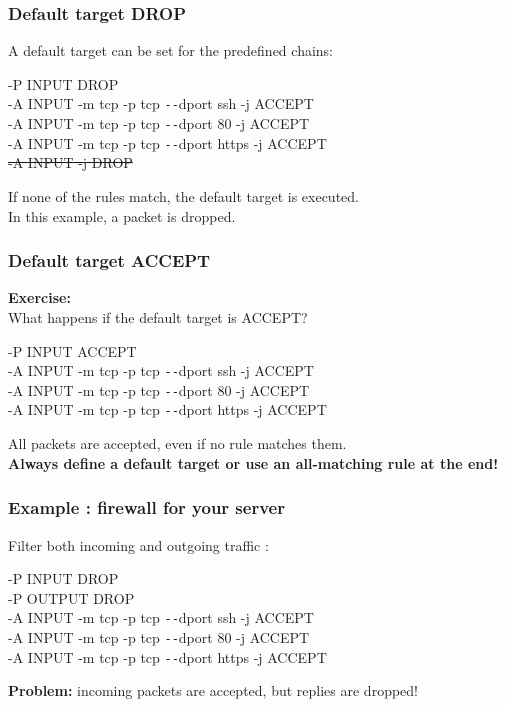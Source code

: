 \documentclass[14pt]{beamer}
\newcommand{\dd}{{\texttt{-{}-}}}
\begin{document}
  \begin{frame}
    \frametitle{Default target DROP}
    A default target can be set for the predefined chains:
    \begin{example}
      \small{{\color{blue}-P INPUT DROP}\\
      -A INPUT -m tcp -p tcp \dd dport ssh -j ACCEPT\\
      -A INPUT -m tcp -p tcp \dd dport 80 -j ACCEPT\\
      -A INPUT -m tcp -p tcp \dd dport https -j ACCEPT\\
      \sout{{\color{red}-A INPUT -j DROP}}}
    \end{example}
    If none of the rules match, the default target is executed.\\
    In this example, a packet is dropped.
  \end{frame}
  \begin{frame}
    \frametitle{Default target ACCEPT}
    \textbf{Exercise:}\\
    What happens if the default target is ACCEPT?
    \begin{example}
      \small{-P INPUT ACCEPT\\
      -A INPUT -m tcp -p tcp \dd dport ssh -j ACCEPT\\
      -A INPUT -m tcp -p tcp \dd dport 80 -j ACCEPT\\
      -A INPUT -m tcp -p tcp \dd dport https -j ACCEPT}
    \end{example}
    \pause
    All packets are accepted, even if no rule matches them.\\
    \pause
    \textbf{Always define a default target or use an all-matching rule at the end!}
  \end{frame}
  \begin{frame}
    \frametitle{Example : firewall for your server}
    Filter both incoming and outgoing traffic :
    \begin{example}
      \small{-P INPUT DROP\\
      -P OUTPUT DROP\\
      -A INPUT -m tcp -p tcp \dd dport ssh -j ACCEPT\\
      -A INPUT -m tcp -p tcp \dd dport 80 -j ACCEPT\\
      -A INPUT -m tcp -p tcp \dd dport https -j ACCEPT}
    \end{example}
    \pause
    \textbf{Problem:} incoming packets are accepted, but replies are dropped!
  \end{frame}
\end{document}

